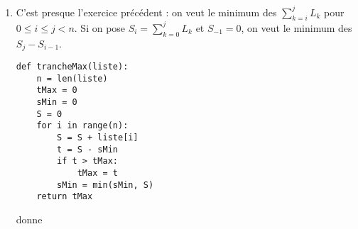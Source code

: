 \begin{Answer}
\begin{enumerate}
\item C'est presque l'exercice précédent : on veut le minimum des $\displaystyle \sum_{k=i}^j L_k$ pour $0\le i \le j < n$. Si on pose $\displaystyle S_i = \sum_{k=0}^j L_k$ et $S_{-1} = 0$, on veut le minimum des $S_j-S_{i-1}$.
\begin{lstlisting}
def trancheMax(liste):
    n = len(liste)
    tMax = 0
    sMin = 0
    S = 0
    for i in range(n):
        S = S + liste[i]
        t = S - sMin
        if t > tMax:
            tMax = t
        sMin = min(sMin, S)
    return tMax
\end{lstlisting}
 donne 
\end{enumerate}

\end{Answer}


